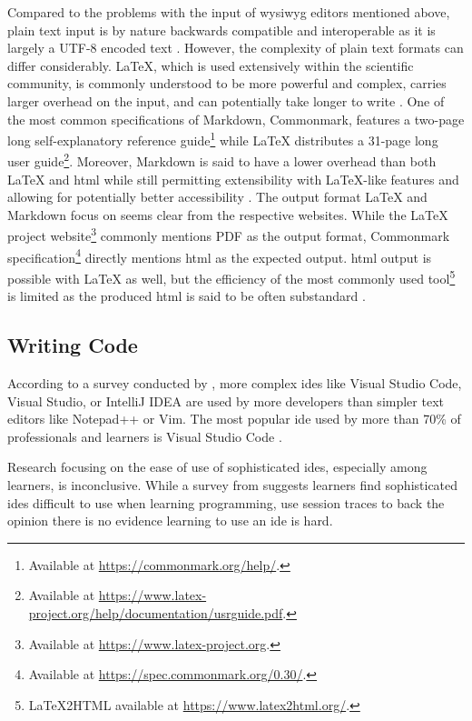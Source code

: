 Compared to the problems with the input of \gls{wysiwyg} editors mentioned above, plain text input is by nature backwards compatible and interoperable as it is largely a UTF-8 encoded text \parencite{shieber_why_2014}.
However, the complexity of plain text formats can differ considerably.
LaTeX, which is used extensively within the scientific community, is commonly understood to be more powerful and complex, carries larger overhead on the input, and can potentially take longer to write \parencites{baramidze_latex_2013}{knauff_efficiency_2014}{shieber_why_2014}.
One of the most common specifications of Markdown, Commonmark, features a two-page long self-explanatory reference guide\footnote{Available at \url{https://commonmark.org/help/}.} while LaTeX distributes a 31-page long user guide\footnote{Available at \url{https://www.latex-project.org/help/documentation/usrguide.pdf}.}.
Moreover, Markdown is said to have a lower overhead than both LaTeX and \gls{html} \parencite{shieber_why_2014} while still permitting extensibility with LaTeX-like features \parencite{shieber_why_2014} and allowing for potentially better accessibility \parencite{voegler_markdown_2014}.
The output format LaTeX and Markdown focus on seems clear from the respective websites.
While the LaTeX project website\footnote{Available at \url{https://www.latex-project.org}.} commonly mentions PDF as the output format, Commonmark specification\footnote{Available at \url{https://spec.commonmark.org/0.30/}.} directly mentions \gls{html} as the expected output.
\gls{html} output is possible with LaTeX as well, but the efficiency of the most commonly used tool\footnote{LaTeX2HTML available at \url{https://www.latex2html.org/}.} is limited as the produced \gls{html} is said to be often substandard \parencite{voegler_markdown_2014}.

\subsection{Writing Code}

According to a survey conducted by \textcite{StackOverflow_2023}, more complex \glspl{ide} like Visual Studio Code, Visual Studio, or IntelliJ IDEA are used by more developers than simpler text editors like Notepad++ or Vim.
The most popular \gls{ide} used by more than 70\% of professionals and learners is Visual Studio Code \parencite{StackOverflow_2023}.

Research focusing on the ease of use of sophisticated \glspl{ide}, especially among learners, is inconclusive.
While a survey from \textcite{owoseni_2016} suggests learners find sophisticated \glspl{ide} difficult to use when learning programming, \textcite{vihavainen_how_2014} use session traces to back the opinion there is no evidence learning to use an \gls{ide} is hard.

